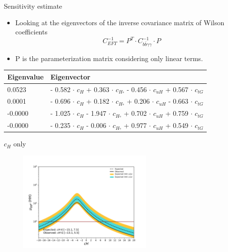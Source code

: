 \begin{frame}{Sensitivity estimate}
    \begin{itemize}
        \item Looking at the eigenvectors of the inverse covariance matrix of Wilson coefficients 
            \begin{equation*}
                C^{-1}_{EFT} = P^T \cdot C^{-1}_{b\bar{b}\gamma\gamma} \cdot P
            \end{equation*}
        
         \item P is the parameterization matrix considering only linear terms. 
    \end{itemize}
   
    
    \begin{table}[]
    \centering
    \begin{tabular}{ll}
    \hline\hline
    Eigenvalue & Eigenvector \\
    \hline
    0.0523  &  - 0.582 $\cdot$ $c_{H}$ + 0.363 $\cdot$ $c_{H\square}$ - 0.456 $\cdot$ $c_{uH}$ + 0.567 $\cdot$ $c_{tG}$ \\ \hline
    0.0001  &  - 0.696 $\cdot$ $c_{H}$ + 0.182 $\cdot$ $c_{H\square}$ + 0.206 $\cdot$ $c_{uH}$ - 0.663 $\cdot$ $c_{tG}$ \\ \hline
    -0.0000 &  - 1.025 $\cdot$ $c_{H}$ - 1.947 $\cdot$ $c_{H\square}$ + 0.702 $\cdot$ $c_{uH}$ + 0.759 $\cdot$ $c_{tG}$ \\ \hline
    -0.0000 &  - 0.235 $\cdot$ $c_{H}$ - 0.006 $\cdot$ $c_{H\square}$ + 0.977 $\cdot$ $c_{uH}$ + 0.549 $\cdot$ $c_{tG}$ \\ \hline
   \hline
    \end{tabular}
\end{table}
\end{frame}

\begin{frame}{$c_{H}$ only}
\begin{figure}
    \centering
    \includegraphics[width=0.6\textwidth]{BackUp/Part5/Img/cH_lambda.pdf}
\end{figure}
\end{frame}

